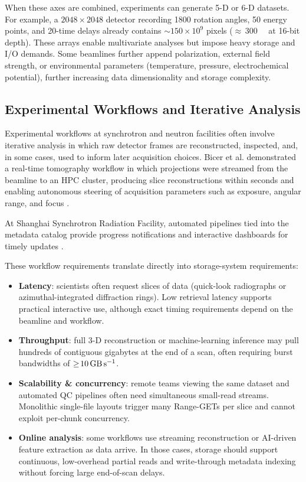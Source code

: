 \documentclass[nomenclature, english, bibtex]{kththesis}
\numberwithin{listing}{chapter}
\begin{document}
When these axes are combined, experiments can generate 5-D or 6-D datasets. For example, a $2048\times2048$ detector recording 1800 rotation angles, 50 energy points, and 20-time delays already contains $\sim150\times10^{9}$ pixels ($\approx$\,\SI{300}{\giga\byte} at 16-bit depth). These arrays enable multivariate analyses but impose heavy storage and I/O demands. Some beamlines further append polarization, external field strength, or environmental parameters (temperature, pressure, electrochemical potential), further increasing data dimensionality and storage complexity.

\subsection{Experimental Workflows and Iterative Analysis}
\label{sec:experimental-workflows-feedback-loops}
Experimental workflows at synchrotron and neutron facilities often involve iterative analysis in which raw detector frames are reconstructed, inspected, and, in some cases, used to inform later acquisition choices. Bicer et al. demonstrated a real-time tomography workflow in which projections were streamed from the beamline to an \gls{HPC} cluster, producing slice reconstructions within seconds and enabling autonomous steering of acquisition parameters such as exposure, angular range, and focus \cite{Bicer2017RealTime}.

At Shanghai Synchrotron Radiation Facility, automated pipelines tied into the metadata catalog provide progress notifications and interactive dashboards for timely updates \cite{wang2024accelerating}.

These workflow requirements translate directly into storage-system requirements:

\begin{itemize}
  \item \textbf{Latency}: scientists often request slices of data (quick-look radiographs or azimuthal-integrated diffraction rings). Low retrieval latency supports practical interactive use, although exact timing requirements depend on the beamline and workflow.
  \item \textbf{Throughput}: full 3-D reconstruction or machine-learning inference may pull hundreds of contiguous gigabytes at the end of a scan, often requiring burst bandwidths of $\ge\!\SI{10}{\giga\byte\per\second}$.
  \item \textbf{Scalability \& concurrency}: remote teams viewing the same dataset and automated QC pipelines often need simultaneous small-read streams. Monolithic single-file layouts trigger many Range-GETs per slice and cannot exploit per-chunk concurrency.
  \item \textbf{Online analysis}: some workflows use streaming reconstruction or AI-driven feature extraction as data arrive. In those cases, storage should support continuous, low-overhead partial reads and write-through metadata indexing without forcing large end-of-scan delays.
\end{itemize}
\end{document}
